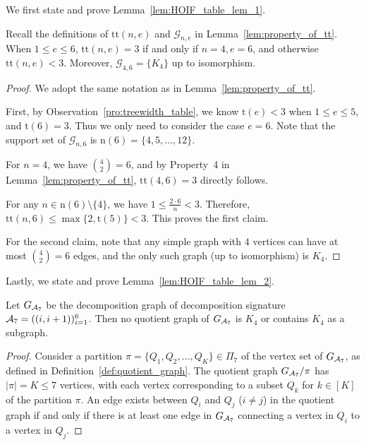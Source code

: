 \documentclass[letterpaper,11pt]{article}
\newcommand{\partition}{\Pi}
\newcommand{\partitionp}[1]{\partition_{#1}}
\newcommand{\graphset}{\mathcal{G}}
\newcommand{\graphsetne}[2]{\graphset_{#1,#2}}
\newcommand{\completegraphp}[1]{K_{#1}}
\newcommand{\graphform}[1]{G_{#1}}
\begin{document}
\begin{bibunit}[plainnat]
We first state and prove Lemma~\ref{lem:HOIF_table_lem_1}.
\begin{lemma}
\label{lem:HOIF_table_lem_1}
Recall the definitions of $\mathrm{tt}(n, e)$ and $\graphsetne{n}{e}$ in Lemma~\ref{lem:property_of_tt}. When $1\le e \le  6$, $\mathrm{tt}(n, e) = 3$ if and only if $n = 4, e = 6$, and otherwise $\mathrm{tt}(n, e) < 3$. Moreover, $\graphsetne{4}{6} = \{\completegraphp{4}\}$ up to isomorphism.
\end{lemma}

\begin{proof}
We adopt the same notation as in Lemma~\ref{lem:property_of_tt}.

First, by Observation~\ref{pro:treewidth_table}, we know $\mathrm{t} (e) < 3$ when $1 \le e \le 5$, and $\mathrm{t}(6) = 3$. Thus we only need to consider the case $e = 6$. Note that the support set of $\graphsetne{n}{6}$ is $\mathrm{n}(6) = \{4,5,\dots,12\}$.
    
For $n = 4$, we have $\binom{4}{2} = 6$, and by Property~4 in Lemma~\ref{lem:property_of_tt}, $\mathrm{tt}(4, 6) = 3$ directly follows.  
    
For any $n \in \mathrm{n}(6) \setminus \{4\}$, we have $1 \le \frac{2 \cdot 6}{n} < 3$.  Therefore, $\mathrm{tt}(n, 6) \le \max\{ 2, \mathrm{t}(5) \} < 3$. This proves the first claim.
    
For the second claim, note that any simple graph with $4$ vertices can have at most $\binom{4}{2} = 6$ edges, and the only such graph (up to isomorphism) is $\completegraphp{4}$. 
\end{proof}

Lastly, we state and prove Lemma~\ref{lem:HOIF_table_lem_2}.

\begin{lemma}
\label{lem:HOIF_table_lem_2}
Let $\graphform{\calA_7}$ be the decomposition graph of decomposition signature ${\mathcal{A}}_7 = ((i,i+1))_{i=1}^6$. Then no quotient graph of $\graphform{\calA_7}$ is $\completegraphp{4}$ or contains $\completegraphp{4}$ as a subgraph.
\end{lemma}

\begin{proof}
Consider a partition $\pi = \{Q_1, Q_2, \dots, Q_K\} \in \partitionp{7}$ of the vertex set of $\graphform{\calA_7}$, as defined in Definition~\ref{def:quotient_graph}. 
The quotient graph $\graphform{\calA_7} / \pi$ has $|\pi| = K \le 7$ vertices, with each vertex corresponding to a subset $Q_k$ for $k \in [K]$ of the partition $\pi$. An edge exists between $Q_i$ and $Q_j$ ($i \neq j$) in the quotient graph if and only if there is at least one edge in $\graphform{\calA_7}$ connecting a vertex in $Q_i$ to a vertex in $Q_j$.


\end{proof}
\end{bibunit}
\end{document}
